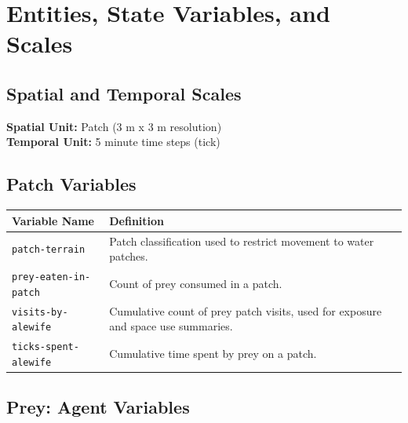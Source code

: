 \documentclass[
]{book}
\begin{document}
\section{Entities, State Variables, and Scales}\label{entities-state-variables-and-scales-11}

\subsection{Spatial and Temporal Scales}\label{spatial-and-temporal-scales-11}

\textbf{Spatial Unit:} Patch (3 m x 3 m resolution)\\
\textbf{Temporal Unit:} 5 minute time steps (tick)

\subsection{Patch Variables}\label{patch-variables-11}

\begin{longtable}[]{@{}
  >{\raggedright\arraybackslash}p{}
  >{\raggedright\arraybackslash}p{}@{}}
\toprule\noalign{}
\begin{minipage}[b]{\linewidth}\raggedright
Variable Name
\end{minipage} & \begin{minipage}[b]{\linewidth}\raggedright
Definition
\end{minipage} \\
\midrule\noalign{}
\endhead
\bottomrule\noalign{}
\endlastfoot
\texttt{patch-terrain} & Patch classification used to restrict movement to water patches. \\
\texttt{prey-eaten-in-patch} & Count of prey consumed in a patch. \\
\texttt{visits-by-alewife} & Cumulative count of prey patch visits, used for exposure and space use summaries. \\
\texttt{ticks-spent-alewife} & Cumulative time spent by prey on a patch. \\
\end{longtable}

\subsection{Prey: Agent Variables}\label{prey-agent-variables}
\end{document}
